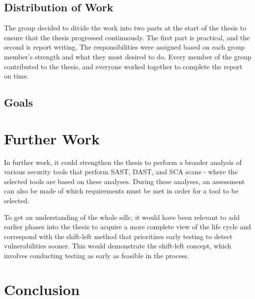 
\subsection{Distribution of Work}
The group decided to divide the work into two parts at the start of the thesis to ensure that the thesis progressed continuously. The first part is practical, and the second is report writing. The responsibilities were assigned based on each group member's strength and what they most desired to do. Every member of the group contributed to the thesis, and everyone worked together to complete the report on time. 


\subsection{Goals}



\section{Further Work}

In further work, it could strengthen the thesis to perform a broader analysis of various security tools that perform SAST, DAST, and SCA scans -  where the selected tools are based on these analyses. During these analyses, an assessment can also be made of which requirements must be met in order for a tool to be selected. 

To get an understanding of the whole \acrlong{sdlc}, it would have been relevant to add earlier phases into the thesis to acquire a more complete view of the life cycle and correspond with the shift-left method that prioritizes early testing to detect vulnerabilities sooner. This would demonstrate the shift-left concept, which involves conducting testing as early as feasible in the process.  

\section{Conclusion}
